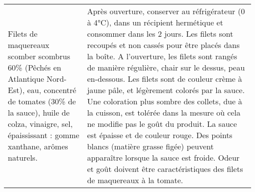\begin{tabular}{p{7cm}p{7cm}}
                                                                                                                                                                                                                                                                       Filets de maquereaux scomber scombrus 60\% (Pêchés en Atlantique Nord-Est), eau, concentré de tomates (30\% de la sauce), huile de colza, vinaigre, sel, épaississant : gomme xanthane, arômes naturels. &                                                                                                                                                                                                                                                                                                                                                                                                                                                                                                                                                                                                                                                              Après ouverture, conserver au réfrigérateur (0 à 4°C), dans un récipient hermétique et consommer  \newline dans les 2 jours.  \newline Les filets sont recoupés et non cassés pour être placés dans la boîte.  \newline A l’ouverture, les filets sont rangés de manière régulière, chair sur le dessus, peau en-dessous.  \newline Les filets sont de couleur crème à jaune pâle, et légèrement colorés par la sauce. Une coloration plus  \newline sombre  des  collets,  due  à  la  cuisson,  est  tolérée  dans  la  mesure  où  cela  ne  modifie  pas  le  goût  du  \newline produit.  \newline La sauce est épaisse et de couleur rouge. Des points blancs (matière grasse figée) peuvent apparaître  \newline lorsque la sauce est froide.  \newline Odeur et goût doivent être caractéristiques des filets de maquereaux à la tomate.  \\

\end{tabular}
